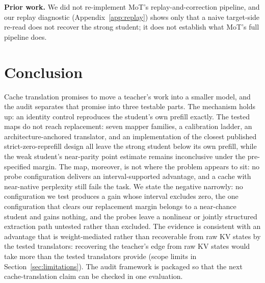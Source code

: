 \documentclass{article} %
\begin{document}
\textbf{Prior work.} We did not re-implement MoT's replay-and-correction
pipeline, and our replay diagnostic (Appendix~\ref{app:replay}) shows only that
a naive target-side re-read does not recover the strong student; it does not
establish what MoT's full pipeline does.

\section{Conclusion}
Cache translation promises to move a teacher's work into a smaller model,
and the audit separates that promise into three testable parts. The
mechanism holds up: an identity control reproduces the student's own prefill
exactly. The tested maps do not reach replacement: seven mapper families, a
calibration ladder, an architecture-anchored translator, and an implementation
of the closest published strict-zero-reprefill design all leave the strong student below its own
prefill, while the weak student's near-parity point estimate remains
inconclusive under the pre-specified margin. The map, moreover, is not where the
problem appears to sit: no probe configuration delivers an interval-supported
advantage, and a cache with near-native perplexity still fails the
task. We state the negative narrowly: no configuration we test produces a gain
whose interval excludes zero, the one configuration that clears our replacement
margin belongs to a near-chance student and gains nothing, and the probes leave
a nonlinear or jointly structured extraction path untested rather than
excluded. The evidence is consistent with an advantage that is weight-mediated
rather than recoverable from raw KV states by the tested translators:
recovering the teacher's edge from raw KV states would take
more than the tested translators provide (scope limits in
Section~\ref{sec:limitations}). The audit framework is
packaged so that the next cache-translation claim can be checked in one
evaluation.




\appendix
\end{document}
